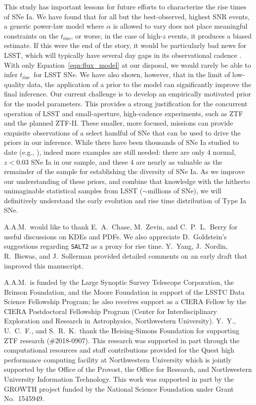 \documentclass[twocolumn]{aastex63}
\newcommand{\trise}{$t_\mathrm{rise}$}
\begin{document}
This study has important lessons for future efforts to characterize the rise
times of SNe Ia. We have found that for all but the best-observed, highest SNR
events, a generic power-law model where $\alpha$ is allowed to vary does not
place meaningful constraints on the \trise, or worse, in the case of high-$z$
events, it produces a biased estimate. If this were the end of the story, it
would be particularly bad news for LSST, which will typically have several day
gaps in its observational cadence \citep{Ivezic08}. With only
Equation~\ref{eqn:flux_model} at our disposal, we would rarely be able to
infer \trise\ for LSST SNe. We have also shown, however, that in the limit of
low-quality data, the application of a prior to the model can significantly
improve the final inference. Our current challenge is to develop an
empirically motivated prior for the model parameters. This provides a strong
justification for the concurrent operation of LSST and small-aperture,
high-cadence experiments, such as ZTF and the planned ZTF-II. These smaller,
more focused, missions can provide exquisite observations of a select handful
of SNe that can be used to drive the priors in our inference. While there have
been thousands of SNe Ia studied to date (e.g., \citealt{Jones17}), indeed
more examples are still needed: there are only 4 normal, $z < 0.03$ SNe Ia in
our sample, and these 4 are nearly as valuable as the remainder of the sample
for establishing the diversity of SNe Ia. As we improve our understanding of
these priors, and combine that knowledge with the hitherto unimaginable
statistical samples from LSST ($\sim$millions of SNe), we will definitively
understand the early evolution and rise time distribution of Type Ia SNe.

\acknowledgements

A.A.M.~would like to thank E.~A.~Chase, M.~Zevin, and C.~P.~L.~Berry for
useful discussions on KDEs and PDFs. We also appreciate D.~Goldstein's
suggestions regarding \texttt{SALT2} as a proxy for rise time. Y.~Yang,
J.~Nordin, R.~Biswas, and J.~Sollerman provided detailed comments on an early
draft that improved this manuscript.

A.A.M.~is funded by the Large Synoptic Survey Telescope Corporation, the
Brinson Foundation, and the Moore Foundation in support of the LSSTC Data
Science Fellowship Program; he also receives support as a CIERA Fellow by the
CIERA Postdoctoral Fellowship Program (Center for Interdisciplinary
Exploration and Research in Astrophysics, Northwestern University). Y.~Y.,
U.~C.~F., and S.~R.~K.~thank the Heising-Simons Foundation for supporting ZTF
research (\#2018-0907). This research was supported in part through the
computational resources and staff contributions provided for the Quest high
performance computing facility at Northwestern University which is jointly
supported by the Office of the Provost, the Office for Research, and
Northwestern University Information Technology. This work was supported in
part by the GROWTH project funded by the National Science Foundation under
Grant No.~1545949.
\end{document}
